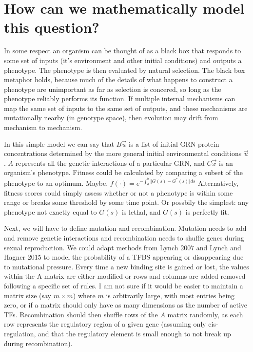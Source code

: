 \documentclass[11 pt]{article}
\begin{document}
\section{How can we mathematically model this question?}

In some respect an organism can be thought of as a black box that responds to
some set of inputs (it's environment and other initial conditions) and outputs
a phenotype. The phenotype is then evaluated by natural selection. The black
box metaphor holds, because much of the details of what happens to construct a
phenotype are unimportant as far as selection is concered, so long as the
phenotype reliably performs its function. If multiple internal mechanisms can
map the same set of inputs to the same set of outputs, and these mechanisms are
mutationally nearby (in genotype space), then evolution may drift from
mechanism to mechanism. 

In this simple model we can say that $B\vec{u}$ is a list of initial GRN
protein concentrations determined by the more general initial environmental
conditions $\vec{u}$. $A$ represents all the genetic interactions of a
particular GRN, and $C\vec{x}$ is an organism's phenotype. Fitness could be
calculated by comparing a subset of the phenotype to an optimum. Maybe,
$f(\cdot) = e^{- \int_{a}^{b} \Vert G(s) - G^{*}(s) \Vert ds}$ Alternatively,
fitness scores could simply assess whether or not a phenotype is within some
range or breaks some threshold by some time point. Or possbily the simplest:
any phenotype not exactly equal to $G(s)$ is lethal, and $G(s)$ is perfectly
fit. 

Next, we will have to define mutation and recombination. Mutation needs to add
and remove genetic interactions and recombination needs to shuffle genes during
sexual reproduction. We could adapt methods from Lynch 2007 and Lynch and
Hagner 2015 to model the probability of a TFBS appearing or disappearing due to
mutational pressure. Every time a new binding site is gained or lost, the
values within the A matrix are either modified or rows and columns are added
removed following a specific set of rules. I am not sure if it would be easier
to maintain a matrix size (say $m \times m$) where $m$ is arbitrarily large,
with  most entries being zero, or if a matrix should only have as many
dimensions as the number of active TFs. Recombination should then shuffle rows
of the $A$ matrix randomly, as each row represents the regulatory region of a
given gene (assuming only cis-regulation, and that the regulatory element is
small enough to not break up during recombination).  
\end{document}
